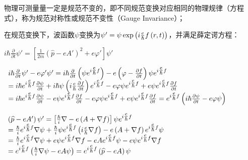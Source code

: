 物理可测量量一定是规范不变的，即不同规范变换对应相同的物理规律（方程式），称为规范对称性或规范不变性（Gauge Invariance）；


在规范变换下，波函数$\psi$变换为$\psi ' = \psi \exp \left( {i{\textstyle{e \over \hbar }}f\left( {r,t} \right)} \right)$，并满足薛定谔方程：

\begin{center}
$i\hbar \frac{\partial }{{\partial t}}\psi ' = \left[ {\frac{1}{{2m}}\left( {\widehat p - eA'} \right)^2  + e\varphi '} \right]\psi '$

$\begin{array}{l}
 i\hbar \frac{\partial }{{\partial t}}\psi ' - e\varphi '\psi ' = i\hbar \frac{\partial }{{\partial t}}\left( {\psi e^{i{\textstyle{e \over \hbar }}f} } \right) - e\left( {\varphi  - \frac{{\partial f}}{{\partial t}}} \right)\psi e^{i{\textstyle{e \over \hbar }}f}  \\
  = i\hbar e^{i{\textstyle{e \over \hbar }}f} \frac{{\partial \psi }}{{\partial t}} + i\hbar \psi \left( {i\frac{e}{\hbar }\frac{{\partial f}}{{\partial t}}} \right)e^{i{\textstyle{e \over \hbar }}f}  - e\varphi \psi e^{i{\textstyle{e \over \hbar }}f}  + e\psi e^{i{\textstyle{e \over \hbar }}f} \frac{{\partial f}}{{\partial t}} \\
  = i\hbar e^{i{\textstyle{e \over \hbar }}f} \frac{{\partial \psi }}{{\partial t}} - e\psi e^{i{\textstyle{e \over \hbar }}f} \frac{{\partial f}}{{\partial t}} - e\varphi \psi e^{i{\textstyle{e \over \hbar }}f}  + e\psi e^{i{\textstyle{e \over \hbar }}f} \frac{{\partial f}}{{\partial t}} = e^{i{\textstyle{e \over \hbar }}f} \left( {i\hbar \frac{{\partial \psi }}{{\partial t}} - e\varphi \psi } \right) \\
 \end{array}$


$\begin{array}{l}
 \left( {\widehat p - eA'} \right)\psi ' = \left[ {\frac{\hbar }{i}\nabla  - e\left( {A + \nabla f} \right)} \right]\psi e^{i{\textstyle{e \over \hbar }}f}  \\
  = \frac{\hbar }{i}e^{i{\textstyle{e \over \hbar }}f} \nabla \psi  + \frac{\hbar }{i}\psi e^{i{\textstyle{e \over \hbar }}f} \left( {i\frac{e}{\hbar }\nabla f} \right) - e\left( {A + \nabla f} \right)e^{i{\textstyle{e \over \hbar }}f} \psi  \\
  = \frac{\hbar }{i}e^{i{\textstyle{e \over \hbar }}f} \nabla \psi  + e\psi e^{i{\textstyle{e \over \hbar }}f} \nabla f - eAe^{i{\textstyle{e \over \hbar }}f} \psi  - e\psi e^{i{\textstyle{e \over \hbar }}f} \nabla f \\
  = e^{i{\textstyle{e \over \hbar }}f} \left( {\frac{\hbar }{i}\nabla \psi  - eA\psi } \right) = e^{i{\textstyle{e \over \hbar }}f} \left( {\widehat p - eA} \right)\psi  \\
 \end{array}$


\end{center}


